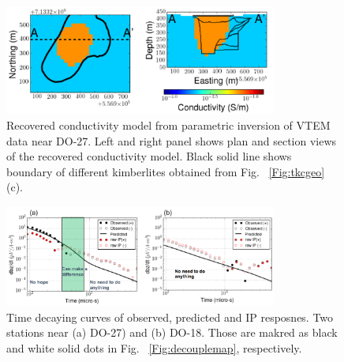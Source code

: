 \documentclass[letterpaper,11pt]{article}
\begin{document}
\begin{figure}[htb]
  \centering
  \includegraphics[width=0.8\textwidth]{figures/paramcond.png}
  \caption{Recovered conductivity model from parametric inversion of VTEM data near DO-27. Left and right panel shows plan and section views of the recovered conductivity model. Black solid line shows boundary of different kimberlites obtained from Fig. ~\ref{Fig:tkcgeo}(c). }
  \label{Fig:paramcond}
\end{figure}

\begin{figure}[htb]
  \centering
  \includegraphics[width=0.8\textwidth]{figures/decoupledecay.png}
  \caption{Time decaying curves of observed, predicted and IP resposnes. Two stations near (a) DO-27) and (b) DO-18. Those are makred as black and white solid dots in Fig. ~\ref{Fig:decouplemap}, respectively.}
  \label{Fig:decoupledecay}
\end{figure}
\end{document}
